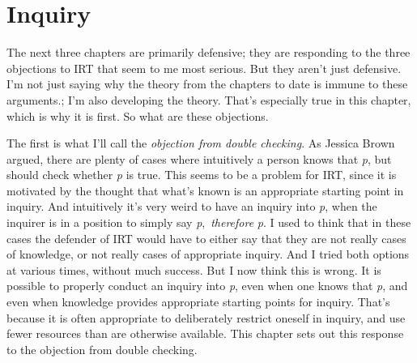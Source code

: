 \documentclass[
  11pt,
]{book}
\begin{document}
\hypertarget{inquiry}{%
\chapter{Inquiry}\label{inquiry}}

The next three chapters are primarily defensive; they are responding to the three objections to IRT that seem to me most serious. But they aren't just defensive. I'm not just saying why the theory from the chapters to date is immune to these arguments.; I'm also developing the theory. That's especially true in this chapter, which is why it is first. So what are these objections.

The first is what I'll call the \emph{objection from double checking}. As Jessica Brown \citeyearpar{Brown2008} argued, there are plenty of cases where intuitively a person knows that \emph{p}, but should check whether \emph{p} is true. This seems to be a problem for IRT, since it is motivated by the thought that what's known is an appropriate starting point in inquiry. And intuitively it's very weird to have an inquiry into \emph{p}, when the inquirer is in a position to simply say \emph{p},~\emph{therefore} \emph{p}. I used to think that in these cases the defender of IRT would have to either say that they are not really cases of knowledge, or not really cases of appropriate inquiry. And I tried both options at various times, without much success. But I now think this is wrong. It is possible to properly conduct an inquiry into \emph{p}, even when one knows that \emph{p}, and even when knowledge provides appropriate starting points for inquiry. That's because it is often appropriate to deliberately restrict oneself in inquiry, and use fewer resources than are otherwise available. This chapter sets out this response to the objection from double checking.
\end{document}
